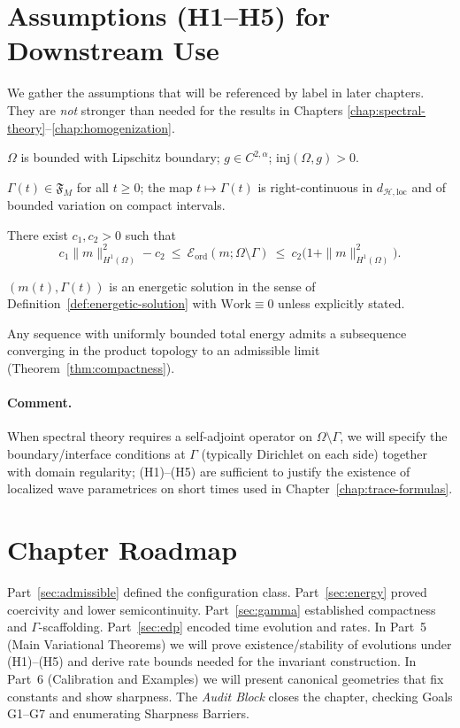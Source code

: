 \section{Assumptions (H1--H5) for Downstream Use}\label{sec:assumptions}
We gather the assumptions that will be referenced by label in later chapters. They are \emph{not} stronger than needed for the results in Chapters \ref{chap:spectral-theory}--\ref{chap:homogenization}.

\begin{description}[style=nextline,leftmargin=2.4em]
  \item[(H1) Geometric regularity.] $\Omega$ is bounded with Lipschitz boundary; $g\in C^{2,\alpha}$; $\mathrm{inj}(\Omega,g)>0$.
  \item[(H2) Fracture control.] $\Gamma(t)\in\mathfrak{F}_M$ for all $t\ge 0$; the map $t\mapsto \Gamma(t)$ is right-continuous in $d_{\mathcal{H},\mathrm{loc}}$ and of bounded variation on compact intervals.
  \item[(H3) Coercivity.] There exist $c_1,c_2>0$ such that
  \[
    c_1\|m\|_{H^1(\Omega)}^2 - c_2 \ \le\ \mathcal{E}_{\mathrm{ord}}(m;\Omega\setminus\Gamma) \ \le\ c_2\bigl(1+\|m\|_{H^1(\Omega)}^2\bigr).
  \]
  \item[(H4) Energetic solution.] $(m(t),\Gamma(t))$ is an energetic solution in the sense of Definition~\ref{def:energetic-solution} with $\mathrm{Work}\equiv 0$ unless explicitly stated.
  \item[(H5) Tightness for limits.] Any sequence with uniformly bounded total energy admits a subsequence converging in the product topology to an admissible limit (Theorem~\ref{thm:compactness}).
\end{description}

\paragraph{Comment.}
When spectral theory requires a self-adjoint operator on $\Omega\setminus\Gamma$, we will specify the boundary/interface conditions at $\Gamma$ (typically Dirichlet on each side) together with domain regularity; (H1)--(H5) are sufficient to justify the existence of localized wave parametrices on short times used in Chapter~\ref{chap:trace-formulas}.

\section{Chapter Roadmap}\label{sec:roadmap}
Part~\ref{sec:admissible} defined the configuration class. Part~\ref{sec:energy} proved coercivity and lower semicontinuity. Part~\ref{sec:gamma} established compactness and $\Gamma$-scaffolding. Part~\ref{sec:edp} encoded time evolution and rates.
In Part~5 (Main Variational Theorems) we will prove existence/stability of evolutions under (H1)--(H5) and derive rate bounds needed for the invariant construction.
In Part~6 (Calibration and Examples) we will present canonical geometries that fix constants and show sharpness.
The \emph{Audit Block} closes the chapter, checking Goals G1--G7 and enumerating Sharpness Barriers.

